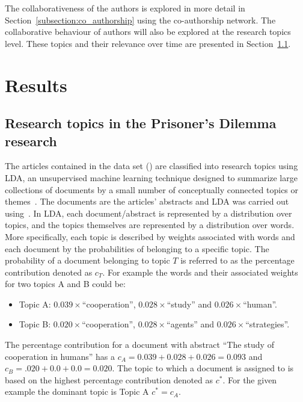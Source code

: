 \documentclass{article}
\theoremstyle{definition}
\begin{document}
The collaborativeness of the authors is explored in more detail in
Section~\ref{subsection:co_authorship} using the co-authorship network. The collaborative
behaviour of authors will also be explored at the research topics level. These topics and their
relevance over time are presented in Section~\ref{subsection:research_topics}.

\section{Results}\label{section:results}

\subsection{Research topics in the Prisoner's Dilemma research}\label{subsection:research_topics}

The articles contained in the data set (\citep{pd_data_2018}) are classified
into research topics using LDA, an unsupervised machine learning technique
designed to summarize large collections of documents by a small number of
conceptually connected topics or themes~\citep{Blei2003, Grimmer2013}. The
documents are the articles' abstracts and LDA was carried out using~\citep{rehurek_lrec}.
In LDA, each document/abstract is represented by a distribution over topics,
and the topics themselves are represented by a distribution over words. More
specifically, each topic is described by weights associated with words and
each document by the probabilities of belonging to a specific topic. The
probability of a document belonging to topic \(T\) is referred to as the percentage
contribution denoted as \(c_T\). For example the words and their associated
weights for two topics A and B could be:

\begin{itemize}
    \item Topic A: \(0.039 \times\)``cooperation'', \(0.028 \times\)``study'' and \(0.026 \times\)``human''.
    \item Topic B: \(0.020 \times\)``cooperation'', \(0.028 \times\)``agents'' and
    \(0.026 \times\)``strategies''.
\end{itemize}

The percentage contribution for a document with abstract ``The study of
cooperation in humans'' has a \(c_{A} = 0.039 + 0.028 + 0.026 = 0.093\) and
\(c_B = .020 + 0.0 + 0.0 = 0.020\). The topic to which a document is assigned to
is based on the highest percentage contribution denoted as \(c^*\). For the
given example the dominant topic is Topic A \(c^*=c_A\).
\end{document}
